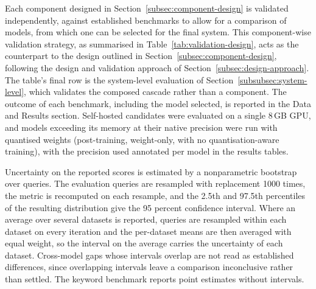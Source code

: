 Each component designed in Section~\ref{subsec:component-design} is validated independently, against established benchmarks to allow for a comparison of models, from which one can be selected for the final system. This component-wise validation strategy, as summarised in Table~\ref{tab:validation-design}, acts as the counterpart to the design outlined in Section~\ref{subsec:component-design}, following the design and validation approach of Section~\ref{subsec:design-approach}. The table's final row is the system-level evaluation of Section~\ref{subsubsec:system-level}, which validates the composed cascade rather than a component. The outcome of each benchmark, including the model selected, is reported in the Data and Results section. Self-hosted candidates were evaluated on a single 8\,GB GPU, and models exceeding its memory at their native precision were run with quantised weights (post-training, weight-only, with no quantisation-aware training), with the precision used annotated per model in the results tables.

Uncertainty on the reported scores is estimated by a nonparametric bootstrap over queries. The evaluation queries are resampled with replacement 1000 times, the metric is recomputed on each resample, and the 2.5th and 97.5th percentiles of the resulting distribution give the 95 percent confidence interval. Where an average over several datasets is reported, queries are resampled within each dataset on every iteration and the per-dataset means are then averaged with equal weight, so the interval on the average carries the uncertainty of each dataset. Cross-model gaps whose intervals overlap are not read as established differences, since overlapping intervals leave a comparison inconclusive rather than settled. The keyword benchmark reports point estimates without intervals.

